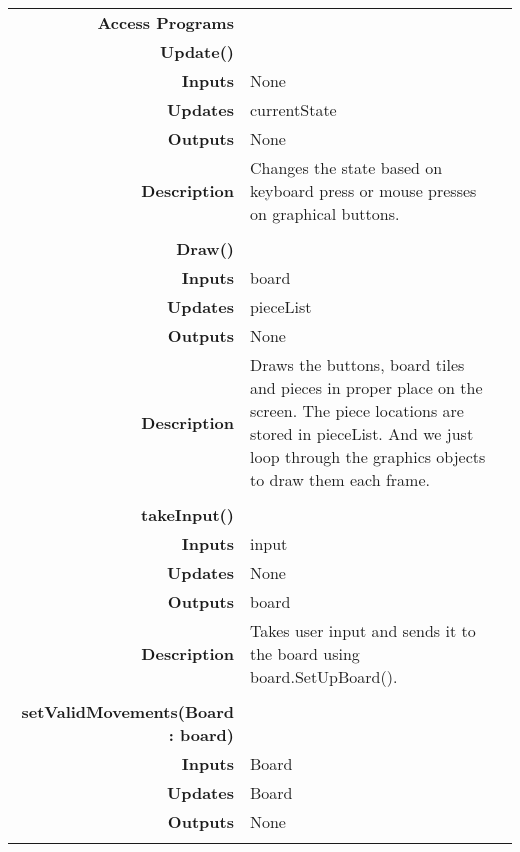 \documentclass[10pt]{article}
\begin{document}
\begin{longtabu}{ >{\bfseries}r Xp{2cm} }
            Access Programs & \begin{tabular}[t]{@{} p{4cm} p{8cm}} 
                                     & \\
                                    \bf{Update()} & \\
                                    Inputs &  None \\
                                    Updates & currentState \\
                                    Outputs & None \\
                                    Description & Changes the state based on keyboard press or mouse presses on graphical buttons.\\
                                     & \\
                                    \bf{Draw()} & \\
                                    Inputs & board \\
                                    Updates & pieceList \\
                                    Outputs & None \\
                                    Description & Draws the buttons, board tiles and pieces in proper place on the screen. The piece locations are stored in pieceList. And we just loop through the graphics objects to draw them each frame. \\
                                     & \\
                                    \bf{takeInput()} & \\
                                    Inputs & input \\
                                    Updates & None \\
                                    Outputs & board \\ 
                                    Description & Takes user input and sends it to the board using board.SetUpBoard().\\
                                    & \\
                                    \bf{setValidMovements(Board : board)} & \\
                                    Inputs & Board \\
                                    Updates & Board \\
                                    Outputs & None \\

\end{tabular}
\end{longtabu}
\end{document}
